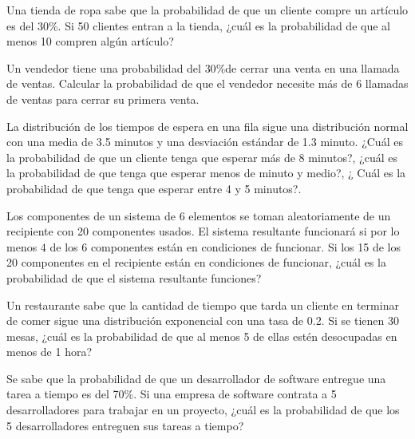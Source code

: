 \begin{Quest}
Una tienda de ropa sabe que la probabilidad de que un cliente compre un artículo es del 30\%. Si 50 clientes entran a la tienda, ¿cuál es la probabilidad de que al menos 10 compren algún artículo?
\end{Quest}



\begin{Quest}
Un vendedor tiene una probabilidad del $30\% $de cerrar una venta en una llamada de ventas. Calcular la probabilidad de que el vendedor necesite más de 6 llamadas de ventas para cerrar su primera venta.
\end{Quest}


\begin{Quest}
La distribución de los tiempos de espera en una fila sigue una distribución normal con una media de 3.5 minutos y una desviación estándar de 1.3 minuto. ¿Cuál es la probabilidad de que un cliente tenga que esperar más de 8 minutos?, ¿cu\'al es la probabilidad de que tenga que esperar menos de minuto y medio?, ¿ Cu\'al es la probabilidad de que tenga que esperar entre 4 y 5 minutos?.
\end{Quest}



\begin{Quest}
Los componentes de un sistema de 6 elementos se toman aleatoriamente de un recipiente con 20 componentes usados. El sistema resultante funcionará si por lo menos 4 de los 6 componentes están en condiciones de funcionar. Si los 15 de los 20 componentes en el recipiente están en condiciones de funcionar, ¿cuál es la probabilidad de que el sistema resultante funciones?
\end{Quest}


\begin{Quest}
Un restaurante sabe que la cantidad de tiempo que tarda un cliente en terminar de comer sigue una distribución exponencial con una tasa de 0.2. Si se tienen 30 mesas, ¿cuál es la probabilidad de que al menos 5 de ellas estén desocupadas en menos de 1 hora?
\end{Quest}




\begin{Quest}
Se sabe que la probabilidad de que un desarrollador de software entregue una tarea a tiempo es del 70\%. Si una empresa de software contrata a 5 desarrolladores para trabajar en un proyecto, ¿cuál es la probabilidad de que los 5 desarrolladores entreguen sus tareas a tiempo?
\end{Quest}


